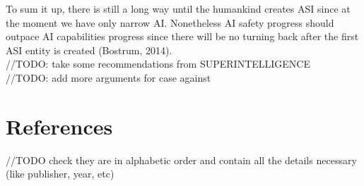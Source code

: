 \documentclass[11pt]{article}
\begin{document}
\indent 
	To sum it up, there is still a long way until the humankind creates ASI since at the moment we have only narrow AI. Nonetheless AI safety progress should outpace AI capabilities progress since there will be no turning back after the first ASI entity is created (Bostrum, 2014).\\


//TODO: take some recommendations from SUPERINTELLIGENCE \\
//TODO: add more arguments for case against
     

\section*{References}
//TODO check they are in alphabetic order and contain all the details necessary (like publisher, year, etc)\\
\end{document}
